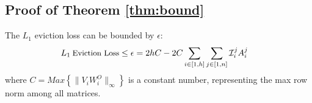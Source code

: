 









\subsection{Proof of Theorem \ref{thm:bound}}
\label{apdx:prof_bound}
\begin{theorem}
	The $L_1$ eviction loss  can be bounded by $\epsilon$:
	{\small 	\begin{align}
			\small
			L_1 \: \text{Eviction Loss} &\leq \epsilon = 2hC - 2C\sum_{i\in [1, h]}\sum_{j \in [1,n ]} \mathcal{I}_i^jA_i^j
	\end{align}	}
	where $C=Max\left\{\lVert V_iW_i^O\rVert_{\infty} \right\}$ is a constant number, representing the max row norm among all matrices.
\end{theorem}

